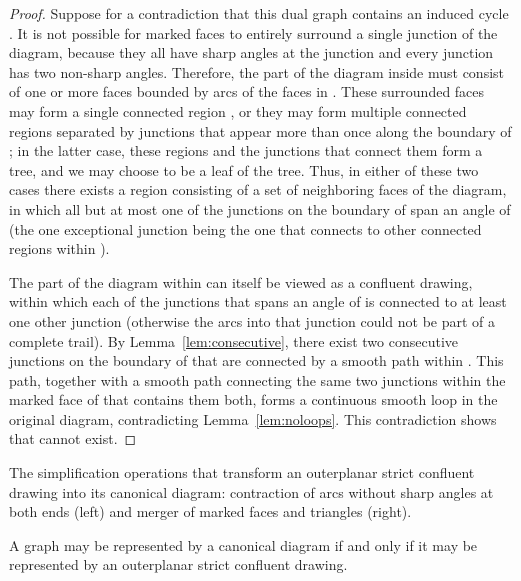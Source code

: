 \documentclass{llncs}
\begin{document}
\begin{proof}
Suppose for a contradiction that this dual graph contains an induced cycle . It is not possible for marked faces to entirely surround a single junction of the diagram, because they all have sharp angles at the junction and every junction has two non-sharp angles. Therefore, the part of the diagram inside  must consist of one or more faces bounded by arcs of the faces in . These surrounded faces may form a single connected region , or they may form multiple connected regions separated by junctions that appear more than once along the boundary of ; in the latter case, these regions and the junctions that connect them form a tree, and we may choose  to be a leaf of the tree. Thus, in either of these two cases there exists a region  consisting of a set of neighboring faces of the diagram, in which all but at most one of the junctions on the boundary of  span an angle of  (the one exceptional junction being the one that connects  to other connected regions within ).

The part of the diagram within  can itself be viewed as a confluent drawing, within which each of the junctions that spans an angle of  is connected to at least one other junction (otherwise the arcs into that junction could not be part of a complete trail). By Lemma~\ref{lem:consecutive}, there exist two consecutive junctions on the boundary of  that are connected by a smooth path within . This path, together with a smooth path connecting the same two junctions within the marked face of  that contains them both, forms a continuous smooth loop in the original diagram, contradicting Lemma~\ref {lem:noloops}. This contradiction shows that  cannot exist.
\end{proof}

 {The simplification operations that transform an outerplanar strict confluent drawing into its canonical diagram: contraction of arcs without sharp angles at both ends (left) and merger of marked faces and triangles (right).}

\begin{lemma}
\label{lem:canonize}
A graph  may be represented by a canonical diagram if and only if it may be represented by an outerplanar strict confluent drawing.
\end{lemma}
\end{document}
